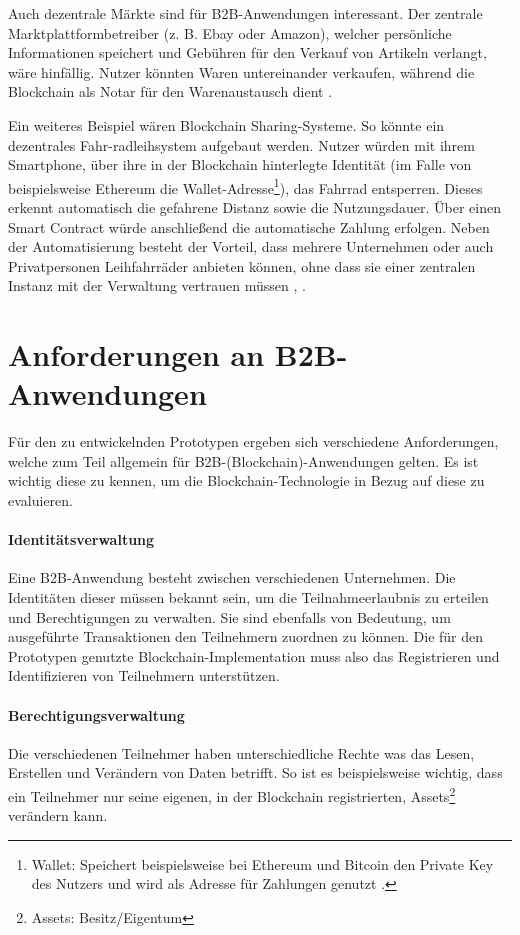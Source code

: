 Auch dezentrale Märkte sind für B2B-Anwendungen interessant. Der zentrale Marktplattformbetreiber (z. B. Ebay oder Amazon), welcher persönliche Informationen speichert und Gebühren für den Verkauf von Artikeln verlangt, wäre hinfällig. Nutzer könnten Waren untereinander verkaufen, während die Blockchain als Notar für den Warenaustausch dient \cite{BenHamidaBlockchainEnterpriseOverview2017}.

Ein weiteres Beispiel wären Blockchain Sharing-Systeme. So könnte ein dezentrales Fahr-radleihsystem aufgebaut werden. Nutzer würden mit ihrem Smartphone, über ihre in der Blockchain hinterlegte Identität (im Falle von beispielsweise Ethereum die Wallet-Adresse\footnote{Wallet: Speichert beispielsweise bei Ethereum und Bitcoin den Private Key des Nutzers und wird als Adresse für Zahlungen genutzt \cite[S.~61 ff.]{AntonopoulosMasteringbitcoin2015}.}), das Fahrrad entsperren. Dieses erkennt automatisch die gefahrene Distanz sowie die Nutzungsdauer. Über einen Smart Contract würde anschließend die automatische Zahlung erfolgen. Neben der Automatisierung besteht der Vorteil, dass mehrere Unternehmen oder auch Privatpersonen Leihfahrräder anbieten können, ohne dass sie einer zentralen Instanz mit der Verwaltung vertrauen müssen \cite{FutureFluxFestivalBlockchainBikes}, \cite{FischerIoTBlockchain}.

\section{Anforderungen an B2B-Anwendungen}
\label{sec:general-requirements}
Für den zu entwickelnden Prototypen ergeben sich verschiedene Anforderungen, welche zum Teil allgemein für B2B-(Blockchain)-Anwendungen gelten. Es ist wichtig diese zu kennen, um die Blockchain-Technologie in Bezug auf diese zu evaluieren.

\paragraph{Identitätsverwaltung}
Eine B2B-Anwendung besteht zwischen verschiedenen Unternehmen. Die Identitäten dieser müssen bekannt sein, um die Teilnahmeerlaubnis zu erteilen und Berechtigungen zu verwalten. Sie sind ebenfalls von Bedeutung, um ausgeführte Transaktionen den Teilnehmern zuordnen zu können. Die für den Prototypen genutzte Blockchain-Implementation muss also das Registrieren und Identifizieren von Teilnehmern unterstützen.

\paragraph{Berechtigungsverwaltung}
Die verschiedenen Teilnehmer haben unterschiedliche Rechte was das Lesen, Erstellen und Verändern von Daten betrifft. So ist es beispielsweise wichtig, dass ein Teilnehmer nur seine eigenen, in der Blockchain registrierten, Assets\footnote{Assets: Besitz/Eigentum} verändern kann.

